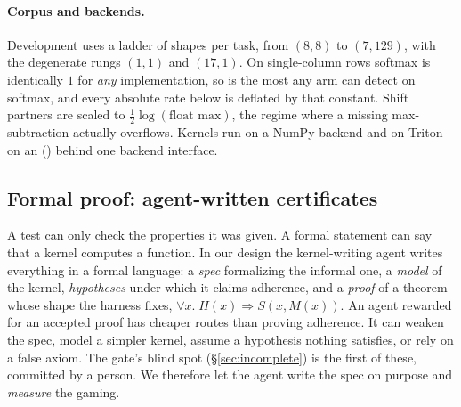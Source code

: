 \paragraph{Corpus and backends.}
Development uses a ladder of \ladderGroups{} shapes per task, from $(8,8)$ to $(7,129)$,
with the degenerate rungs $(1,1)$ and $(17,1)$. On single-column rows softmax is
identically $1$ for \emph{any} implementation, so \ladderCeiling{} is the most any arm
can detect on softmax, and every absolute rate below is deflated by that constant. Shift
partners are scaled to $\tfrac12\log(\text{float max})$, the regime where a missing
max-subtraction actually overflows. Kernels run on a NumPy backend and on Triton
\tritonVersion{} on an \gpuName{} (\gpuArch) behind one backend interface.

\subsection{Formal proof: agent-written certificates}
\label{sec:formal}

A test can only check the properties it was given. A formal statement can say that a
kernel computes a function. In our design the kernel-writing agent writes everything
in a formal language: a \emph{spec} formalizing the informal one, a \emph{model} of the
kernel, \emph{hypotheses} under which it claims adherence, and a \emph{proof} of a
theorem whose shape the harness fixes, $\forall x.\; H(x) \Rightarrow S(x, M(x))$. An
agent rewarded for an accepted proof has cheaper routes than proving adherence. It can
weaken the spec, model a simpler kernel, assume a hypothesis nothing satisfies, or
rely on a false axiom. The gate's blind spot (\S\ref{sec:incomplete}) is the first of
these, committed by a person. We therefore let the agent write the spec on purpose and
\emph{measure} the gaming.

